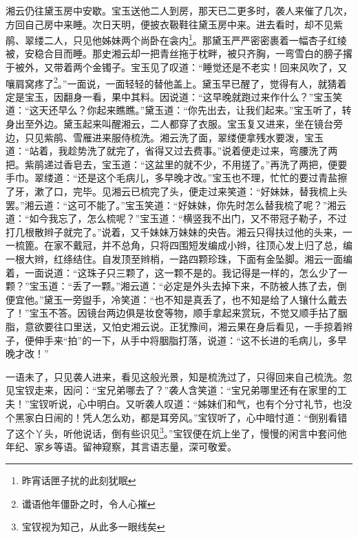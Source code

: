 \documentclass[12pt,oneside]{book}
\begin{document}
湘云仍往黛玉房中安歇。宝玉送他二人到房，那天已二更多时，袭人来催了几次，方回自己房中来睡。次日天明，便披衣靸鞋往黛玉房中来。进去看时，却不见紫鹃、翠缕二人，只见他姊妹两个尚卧在衾内\footnote{昨宵话匣子扰的此刻犹眠}。那黛玉严严密密裹着一幅杏子红绫被，安稳合目而睡。那史湘云却一把青丝拖于枕畔，被只齐胸，一弯雪白的膀子撂于被外，又带着两个金镯子。宝玉见了叹道：“睡觉还是不老实！回来风吹了，又嚷肩窝疼了\footnote{谶语他年僵卧之时，令人心摧}。”一面说，一面轻轻的替他盖上。黛玉早已醒了，觉得有人，就猜着定是宝玉，因翻身一看，果中其料。因说道：“这早晚就跑过来作什么？”宝玉笑道：“这天还早么？你起来瞧瞧。”黛玉道：“你先出去，让我们起来。”宝玉听了，转身出至外边。黛玉起来叫醒湘云，二人都穿了衣服。宝玉复又进来，坐在镜台旁边，只见紫鹃、雪雁进来服侍梳洗。湘云洗了面，翠缕便拿残水要泼，宝玉道：“站着，我趁势洗了就完了，省得又过去费事。”说着便走过来，弯腰洗了两把。紫鹃递过香皂去，宝玉道：“这盆里的就不少，不用搓了。”再洗了两把，便要手巾。翠缕道：“还是这个毛病儿，多早晚才改。”宝玉也不理，忙忙的要过青盐擦了牙，漱了口，完毕。见湘云已梳完了头，便走过来笑道：“好妹妹，替我梳上头罢。”湘云道：“这可不能了。”宝玉笑道：“好妹妹，你先时怎么替我梳了呢？”湘云道：“如今我忘了，怎么梳呢？”宝玉道：“横竖我不出门，又不带冠子勒子，不过打几根散辫子就完了。”说着，又千妹妹万妹妹的央告。湘云只得扶过他的头来，一一梳篦。在家不戴冠，并不总角，只将四围短发编成小辫，往顶心发上归了总，编一根大辫，红绦结住。自发顶至辫梢，一路四颗珍珠，下面有金坠脚。湘云一面编着，一面说道：“这珠子只三颗了，这一颗不是的。我记得是一样的，怎么少了一颗？”宝玉道：“丢了一颗。”湘云道：“必定是外头去掉下来，不防被人拣了去，倒便宜他。”黛玉一旁盥手，冷笑道：“也不知是真丢了，也不知是给了人镶什么戴去了！”宝玉不答。因镜台两边俱是妆奁等物，顺手拿起来赏玩，不觉又顺手拈了胭脂，意欲要往口里送，又怕史湘云说。正犹豫间，湘云果在身后看见，一手掠着辫子，便伸手来“拍”的一下，从手中将胭脂打落，说道：“这不长进的毛病儿，多早晚才改！”

一语未了，只见袭人进来，看见这般光景，知是梳洗过了，只得回来自己梳洗。忽见宝钗走来，因问：“宝兄弟哪去了？”袭人含笑道：“宝兄弟哪里还有在家里的工夫！”宝钗听说，心中明白。又听袭人叹道：“姊妹们和气，也有个分寸礼节，也没个黑家白日闹的！凭人怎么劝，都是耳旁风。”宝钗听了，心中暗忖道：“倒别看错了这个丫头，听他说话，倒有些识见\footnote{宝钗视为知己，从此多一眼线矣}。”宝钗便在炕上坐了，慢慢的闲言中套问他年纪、家乡等语。留神窥察，其言语志量，深可敬爱。
\end{document}
